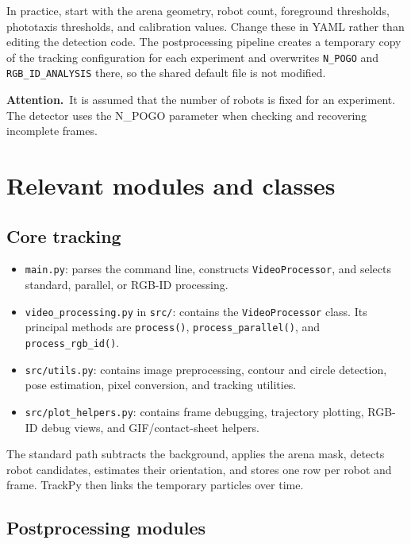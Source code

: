 \documentclass[11pt,a4paper]{article}
\newcommand{\warning}[1]{%
  \begin{tcolorbox}[
    colback=PogoOrange!10,
    colframe=PogoOrange,
    boxrule=0.8pt,
    arc=2mm,
    left=4mm,right=4mm,top=2.5mm,bottom=2.5mm
  ]
  \textcolor{PogoOrange!85!black}{\textbf{Attention.}}~#1
  \end{tcolorbox}%
}
\begin{document}
In practice, start with the arena geometry, robot count, foreground thresholds, phototaxis thresholds, and calibration values. Change these in YAML rather than editing the detection code. The postprocessing pipeline creates a temporary copy of the tracking configuration for each experiment and overwrites \texttt{N\_POGO} and \texttt{RGB\_ID\_ANALYSIS} there, so the shared default file is not modified.

\warning{It is assumed that the number of robots is fixed for an experiment. The detector uses the {N\_POGO} parameter when checking and recovering incomplete frames.}

\section{Relevant modules and classes}

\subsection{Core tracking}

\begin{itemize}
  \item \texttt{main.py}: parses the command line, constructs \texttt{VideoProcessor}, and selects standard, parallel, or RGB-ID processing.
  \item \texttt{video\_processing.py} in \texttt{src/}: contains the \texttt{VideoProcessor} class. Its principal methods are \texttt{process()}, \texttt{process\_parallel()}, and \texttt{process\_rgb\_id()}.
  \item \texttt{src/utils.py}: contains image preprocessing, contour and circle detection, pose estimation, pixel conversion, and tracking utilities.
  \item \texttt{src/plot\_helpers.py}: contains frame debugging, trajectory plotting, RGB-ID debug views, and GIF/contact-sheet helpers.
\end{itemize}

The standard path subtracts the background, applies the arena mask, detects robot candidates, estimates their orientation, and stores one row per robot and frame. TrackPy then links the temporary particles over time.

\subsection{Postprocessing modules}
\end{document}
